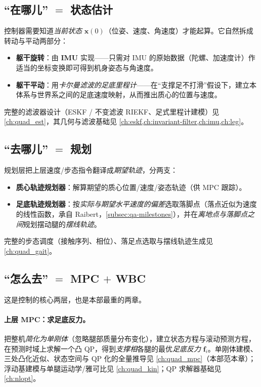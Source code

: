 \subsection{“在哪儿” \texorpdfstring{$=$}{=} 状态估计}
\label{subsec:qa-est}

控制器需要知道\emph{当前状态} $\boldsymbol x(0)$（位姿、速度、角速度）才能起算。它自然拆成转动与平动两部分\cite{yu2021quadruped}：
\begin{itemize}
  \item \textbf{躯干旋转}：由 \textbf{IMU} 实现——只需对 IMU 的原始数据（陀螺、加速度计）作适当的坐标变换即可得到机身姿态与角速度。
  \item \textbf{躯干平动}：用\emph{卡尔曼滤波的足底里程计}——在“支撑足不打滑”假设下，建立本体系与世界系之间的足底速度映射，从而推出质心的位置与速度。
\end{itemize}
完整的滤波器设计（ESKF / 不变滤波 RIEKF、足式里程计建模）见 \cref{ch:quad_est}，其几何与滤波基础见 \cref{ch:eskf,ch:invariant-filter,ch:imu,ch:leg}。

\subsection{“去哪儿” \texorpdfstring{$=$}{=} 规划}
\label{subsec:qa-plan}

规划层把上层速度/步态指令翻译成\emph{期望轨迹}，分两支\cite{yu2021quadruped}：
\begin{itemize}
  \item \textbf{质心轨迹规划器}：解算期望的质心位置/速度/姿态轨迹（供 MPC 跟踪）。
  \item \textbf{足底轨迹规划器}：按\emph{实际与期望水平速度的偏差}选取落脚点（落点近似为速度的线性函数，承自 Raibert，\cref{subsec:qa-milestones}），并在\emph{离地点与落脚点之间}规划摆动腿的\emph{摆线轨迹}。
\end{itemize}
完整的步态调度（接触序列、相位）、落足点选取与摆线轨迹生成见 \cref{ch:quad_gait}。

\subsection{“怎么去” \texorpdfstring{$=$}{=} MPC \texorpdfstring{$+$}{+} WBC}
\label{subsec:qa-mpc-wbc}

这是控制的核心两层，也是本部最重的两章。

\paragraph{上层 MPC：求足底反力。}
把整机\emph{简化为单刚体}（忽略腿部质量分布变化），建立状态方程与滚动预测方程，在预测时域上求解一个凸 QP，得到\emph{支撑相}各腿的最优\emph{足底反力} $\mathbf{f}_i$。单刚体建模、三处凸化近似、状态空间与 QP 化的全量推导见 \cref{ch:quad_mpc}（本部范本章）；浮动基建模与单腿运动学/雅可比见 \cref{ch:quad_kin}；QP 求解器基础见 \cref{ch:nlopt}。

